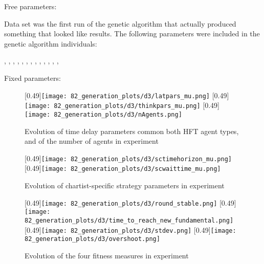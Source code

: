Free parameters:

Data set \dthree was the first run of the genetic algorithm that actually produced something that looked like results. The following parameters were included in the genetic algorithm individuals:
\begin{center}
\sclatencymu, \sclatencys, \scnAgents, \scthinkmu, \scthinks, \sctimehorizonmu, \sctimehorizons, \scwaitTimeBetweenTradingmu, \scwaitTimeBetweenTradings, \ssmmlatencymu, \ssmmlatencys, \ssmmnAgents, \ssmmthinkmu, \ssmmthinks
\end{center}

Fixed parameters:




\begin{figure}
	\centering
	[0.49\linewidth]{\texttt{[image: 82\_generation\_plots/d3/latpars\_mu.png]}}
	[0.49\linewidth]{\texttt{[image: 82\_generation\_plots/d3/thinkpars\_mu.png]}}
	[0.49\linewidth]{\texttt{[image: 82\_generation\_plots/d3/nAgents.png]}}
	\caption{Evolution of time delay parameters common both HFT agent types, and of the number of agents in experiment \dthree}\label{fig:d3_evolution_latpars_nAgents}
\end{figure}


\begin{figure}
	[0.49\linewidth]{\texttt{[image: 82\_generation\_plots/d3/sctimehorizon\_mu.png]}}
	[0.49\linewidth]{\texttt{[image: 82\_generation\_plots/d3/scwaittime\_mu.png]}}
	\caption{Evolution of chartist-specific strategy parameters in experiment \dthree}\label{fig:d3_evolution_thinkpars}
\end{figure}

\begin{figure}
	\centering
	[0.49\linewidth]{\texttt{[image: 82\_generation\_plots/d3/round\_stable.png]}}
	[0.49\linewidth]{\texttt{[image: 82\_generation\_plots/d3/time\_to\_reach\_new\_fundamental.png]}}
	[0.49\linewidth]{\texttt{[image: 82\_generation\_plots/d3/stdev.png]}}
	[0.49\linewidth]{\texttt{[image: 82\_generation\_plots/d3/overshoot.png]}}
	\caption{Evolution of the four fitness measures in experiment \dthree}\label{fig:d3_evolution_fitness}
\end{figure}


